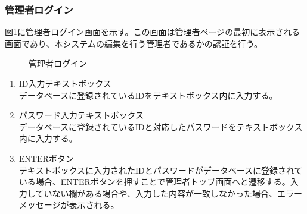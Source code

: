 \documentclass[a4j]{jarticle}
\begin{document}
\subsubsection{管理者ログイン}
図\ref{fig:login_admin}に管理者ログイン画面を示す。この画面は管理者ページの最初に表示される画面であり、本システムの編集を行う管理者であるかの認証を行う。
\begin{figure}[H]
\centering
{}
\caption{管理者ログイン}
\label{fig:login_admin}
\end{figure}
\begin{enumerate}
  \renewcommand{\labelenumi}{\textcircled{\scriptsize \theenumi}}

\item ID入力テキストボックス\\
データベースに登録されているIDをテキストボックス内に入力する。
\item パスワード入力テキストボックス\\
データベースに登録されているIDと対応したパスワードをテキストボックス内に入力する。
\item ENTERボタン\\
テキストボックスに入力されたIDとパスワードがデータベースに登録されている場合、ENTERボタンを押すことで管理者トップ画面へと遷移する。入力していない欄がある場合や、入力した内容が一致しなかった場合、エラーメッセージが表示される。

\end{enumerate}
\end{document}
